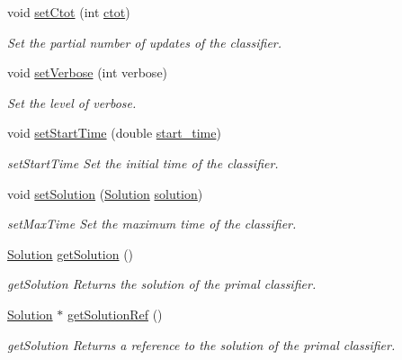 \begin{DoxyCompactItemize}
void \mbox{\hyperlink{class_classifier_a318ff28416f40269c532a80827fb30fb}{set\+Ctot}} (int \mbox{\hyperlink{class_classifier_af3bc30b5c675507c12b23fbbc7164093}{ctot}})
\begin{DoxyCompactList}\small\item\em Set the partial number of updates of the classifier. \end{DoxyCompactList}\item 
void \mbox{\hyperlink{class_classifier_ac9e142714dff18a8caa5c9e3d7cfcbfc}{set\+Verbose}} (int verbose)
\begin{DoxyCompactList}\small\item\em Set the level of verbose. \end{DoxyCompactList}\item 
void \mbox{\hyperlink{class_classifier_a92fd489e75afe8b1bd2c88c478cf8f60}{set\+Start\+Time}} (double \mbox{\hyperlink{class_classifier_a7ed1462d90a26a7f3050be4c29ad6ff7}{start\+\_\+time}})
\begin{DoxyCompactList}\small\item\em set\+Start\+Time Set the initial time of the classifier. \end{DoxyCompactList}\item 
void \mbox{\hyperlink{class_classifier_a2eb8d760224eba3091c108155996d3d9}{set\+Solution}} (\mbox{\hyperlink{class_solution}{Solution}} \mbox{\hyperlink{class_classifier_adecdc97505c2911a66e240ad0fefd9ea}{solution}})
\begin{DoxyCompactList}\small\item\em set\+Max\+Time Set the maximum time of the classifier. \end{DoxyCompactList}\item 
\mbox{\hyperlink{class_solution}{Solution}} \mbox{\hyperlink{class_classifier_a225887f545e5ad0a2bb414f969771cca}{get\+Solution}} ()
\begin{DoxyCompactList}\small\item\em get\+Solution Returns the solution of the primal classifier. \end{DoxyCompactList}\item 
\mbox{\hyperlink{class_solution}{Solution}} $\ast$ \mbox{\hyperlink{class_classifier_a4845fd932adb55becf78bfa4fccbea59}{get\+Solution\+Ref}} ()
\begin{DoxyCompactList}\small\item\em get\+Solution Returns a reference to the solution of the primal classifier. \end{DoxyCompactList}\item 

\end{DoxyCompactItemize}

